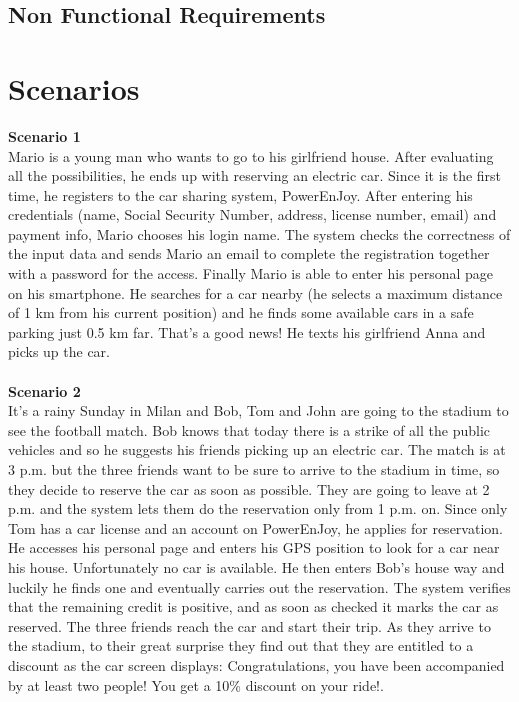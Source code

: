 \documentclass[11pt,a4paper]{report}
\begin{document}
\section{Non Functional Requirements}

\chapter{Scenarios}
\textbf{Scenario 1}\\
Mario is a young man who wants to go to his girlfriend house. After evaluating all the possibilities, he ends up with reserving an electric car. Since it is the first time, he registers to the car sharing system, PowerEnJoy. After entering his credentials (name, Social Security Number, address, license number, email) and payment info, Mario chooses his login name. The system checks the correctness of the input data and sends Mario an email to complete the registration together with a password for the access. 
Finally Mario is able to enter his personal page on his smartphone. He searches for a car nearby (he selects a maximum distance of 1 km from his current position) and he finds some available cars in a safe parking just 0.5 km far. That's a good news! He texts his girlfriend Anna and picks up the car.\\ 
\noindent \\
\textbf{Scenario 2}\\
It's a rainy Sunday in Milan and Bob, Tom and John are going to the stadium to see the football match. Bob knows that today there is a strike of all the public vehicles and so he suggests his friends picking up an electric car. The match is at 3 p.m. but the three friends want to be sure to arrive to the stadium in time, so they decide to reserve the car as soon as possible. They are going to leave at 2 p.m. and the system lets them do the reservation only from 1 p.m. on. Since only Tom has a car license and an account on PowerEnJoy, he applies for reservation. He accesses his personal page and enters his GPS position to look for a car near his house. Unfortunately no car is available. He then enters Bob's house way and luckily he finds one and eventually carries out the reservation. The system verifies that the remaining credit is positive, and as soon as checked it marks the car as reserved. 
The three friends reach the car and start their trip. As they arrive to the stadium, to their great surprise they find out that they are entitled to a discount as the car screen displays: Congratulations, you have been accompanied by at least two people! You get a 10\% discount on your ride!. \\ 
\end{document}
